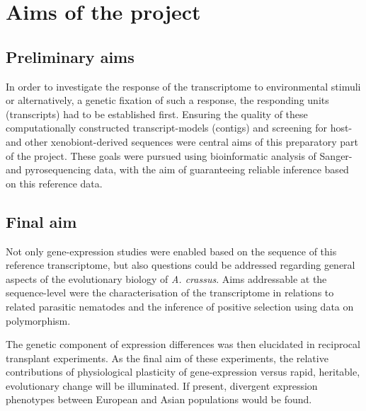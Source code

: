 
\chapter{Aims of the project} %



\section{Preliminary aims}

In order to investigate the response of the transcriptome to
environmental stimuli or alternatively, a genetic fixation of such a
response, the responding units (transcripts) had to be established
first. Ensuring the quality of these computationally constructed
transcript-models (contigs) and screening for host- and other
xenobiont-derived sequences were central aims of this preparatory part
of the project. These goals were pursued using bioinformatic analysis
of Sanger- and pyrosequencing data, with the aim of guaranteeing
reliable inference based on this reference data.

\section{Final aim}

Not only gene-expression studies were enabled based on the sequence of
this reference transcriptome, but also questions could be addressed
regarding general aspects of the evolutionary biology of
\textit{A. crassus}. Aims addressable at the sequence-level were the
characterisation of the transcriptome in relations to related
parasitic nematodes and the inference of positive selection using
data on polymorphism.

The genetic component of expression differences was then elucidated in
reciprocal transplant experiments. As the final aim of these
experiments, the relative contributions of physiological plasticity of
gene-expression versus rapid, heritable, evolutionary change will be
illuminated. If present, divergent expression phenotypes between
European and Asian populations would be found.




     